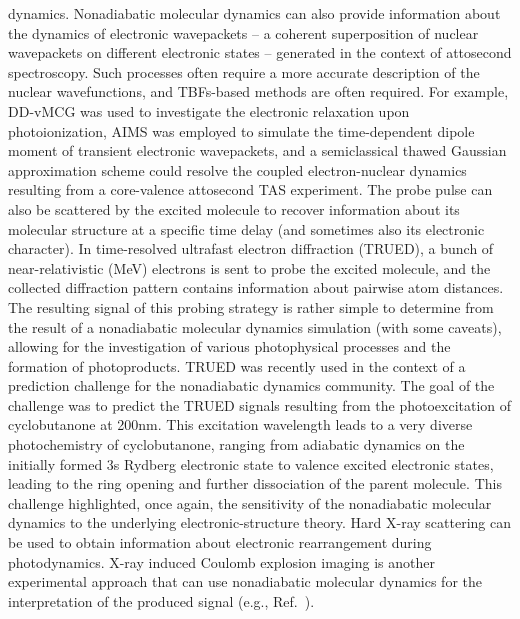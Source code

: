 \documentclass[9pt,bestpractices]{livecoms}
\begin{document}
dynamics.\cite{schuurman2021ATAS} Nonadiabatic molecular dynamics can also provide information about the dynamics of electronic wavepackets -- a coherent superposition of nuclear wavepackets on different electronic states -- generated in the context of attosecond spectroscopy. Such processes often require a more accurate description of the nuclear wavefunctions, and TBFs-based methods are often required. For example, DD-vMCG was used to investigate the electronic relaxation upon photoionization,\cite{vacher2017electron} AIMS was employed to simulate the time-dependent dipole moment of transient electronic wavepackets,\cite{mignolet2018walk} and a semiclassical thawed Gaussian approximation scheme could resolve the coupled electron-nuclear dynamics resulting from a core-valence attosecond TAS experiment.\cite{golubevPRL2021}  The probe pulse can also be scattered by the excited molecule to recover information about its molecular structure at a specific time delay (and sometimes also its electronic character). In time-resolved ultrafast electron diffraction (TRUED), a bunch of near-relativistic (MeV) electrons is sent to probe the excited molecule, and the collected diffraction pattern contains information about pairwise atom distances. The resulting signal of this probing strategy is rather simple to determine from the result of a nonadiabatic molecular dynamics simulation (with some caveats), allowing for the investigation of various photophysical processes\cite{yang2018imaging,wolf2019photochemical,PhysRevLett.131.143001} and the formation of photoproducts.\cite{nunes2024ued} TRUED was recently used in the context of a prediction challenge for the nonadiabatic dynamics community.\cite{predictionchallenge} The goal of the challenge was to predict the TRUED signals resulting from the photoexcitation of cyclobutanone at 200nm. This excitation wavelength leads to a very diverse photochemistry of cyclobutanone, ranging from adiabatic dynamics on the initially formed 3s Rydberg electronic state to valence excited electronic states, leading to the ring opening and further dissociation of the parent molecule. This challenge highlighted, once again, the sensitivity of the nonadiabatic molecular dynamics to the underlying electronic-structure theory. Hard X-ray scattering can be used to obtain information about electronic rearrangement during photodynamics.\cite{gabalski2025imaging}
X-ray induced Coulomb explosion imaging is another experimental approach that can use nonadiabatic molecular dynamics for the interpretation of the produced signal (e.g., Ref.~). 
\end{document}
